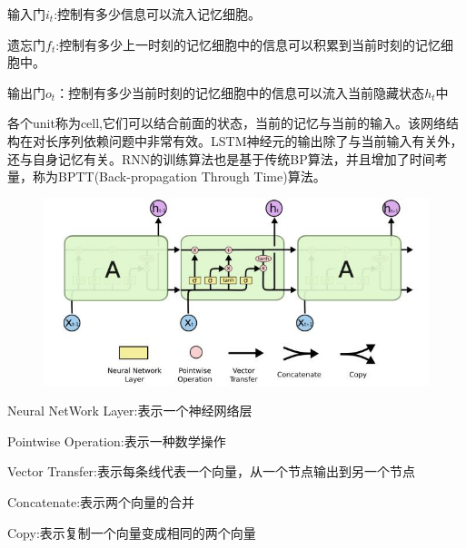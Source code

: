 \documentclass[openbib]{article}
\begin{document}
输入门$i_t$:控制有多少信息可以流入记忆细胞。

遗忘门$f_t$:控制有多少上一时刻的记忆细胞中的信息可以积累到当前时刻的记忆细胞中。

输出门$o_t$：控制有多少当前时刻的记忆细胞中的信息可以流入当前隐藏状态$h_t$中

各个unit称为cell,它们可以结合前面的状态，当前的记忆与当前的输入。该网络结构在对长序列依赖问题中非常有效。LSTM神经元的输出除了与当前输入有关外，还与自身记忆有关。RNN的训练算法也是基于传统BP算法，并且增加了时间考量，称为BPTT(Back-propagation Through Time)算法。
\begin{figure}[htbp]
	\centering
	\includegraphics[scale=0.42]{LSTM内部结构}
\end{figure}

Neural NetWork Layer:表示一个神经网络层

Pointwise Operation:表示一种数学操作

Vector Transfer:表示每条线代表一个向量，从一个节点输出到另一个节点

Concatenate:表示两个向量的合并

Copy:表示复制一个向量变成相同的两个向量
\end{document}
